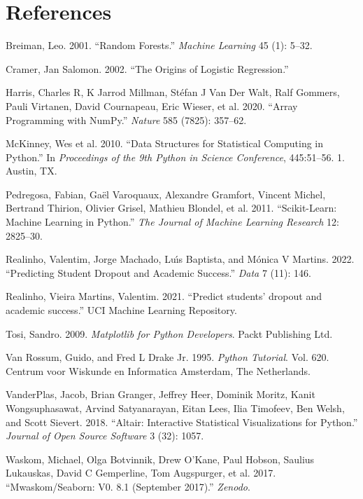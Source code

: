 \documentclass[
]{article}
\newlength{\cslhangindent}
\newlength{\cslentryspacingunit} %
\newenvironment{CSLReferences}[2] %
 {%
  \setlength{\parindent}{0pt}
  \ifodd #1
  \let\oldpar\par
  \def\par{\hangindent=\cslhangindent\oldpar}
  \fi
  \setlength{\parskip}{#2\cslentryspacingunit}
 }%
 {}
\begin{document}
\hypertarget{references}{%
\section*{References}\label{references}}

\hypertarget{refs}{}
\begin{CSLReferences}{1}{0}
\leavevmode{}%
Breiman, Leo. 2001. {``Random Forests.''} \emph{Machine Learning} 45
(1): 5--32.

\leavevmode{}%
Cramer, Jan Salomon. 2002. {``The Origins of Logistic Regression.''}

\leavevmode{}%
Harris, Charles R, K Jarrod Millman, Stéfan J Van Der Walt, Ralf
Gommers, Pauli Virtanen, David Cournapeau, Eric Wieser, et al. 2020.
{``Array Programming with NumPy.''} \emph{Nature} 585 (7825): 357--62.

\leavevmode{}%
McKinney, Wes et al. 2010. {``Data Structures for Statistical Computing
in Python.''} In \emph{Proceedings of the 9th Python in Science
Conference}, 445:51--56. 1. Austin, TX.

\leavevmode{}%
Pedregosa, Fabian, Gaël Varoquaux, Alexandre Gramfort, Vincent Michel,
Bertrand Thirion, Olivier Grisel, Mathieu Blondel, et al. 2011.
{``Scikit-Learn: Machine Learning in Python.''} \emph{The Journal of
Machine Learning Research} 12: 2825--30.

\leavevmode{}%
Realinho, Valentim, Jorge Machado, Luı́s Baptista, and Mónica V Martins.
2022. {``Predicting Student Dropout and Academic Success.''} \emph{Data}
7 (11): 146.

\leavevmode{}%
Realinho, Vieira Martins, Valentim. 2021. {``{Predict students' dropout
and academic success}.''} UCI Machine Learning Repository.

\leavevmode{}%
Tosi, Sandro. 2009. \emph{Matplotlib for Python Developers}. Packt
Publishing Ltd.

\leavevmode{}%
Van Rossum, Guido, and Fred L Drake Jr. 1995. \emph{Python Tutorial}.
Vol. 620. Centrum voor Wiskunde en Informatica Amsterdam, The
Netherlands.

\leavevmode{}%
VanderPlas, Jacob, Brian Granger, Jeffrey Heer, Dominik Moritz, Kanit
Wongsuphasawat, Arvind Satyanarayan, Eitan Lees, Ilia Timofeev, Ben
Welsh, and Scott Sievert. 2018. {``Altair: Interactive Statistical
Visualizations for Python.''} \emph{Journal of Open Source Software} 3
(32): 1057.

\leavevmode{}%
Waskom, Michael, Olga Botvinnik, Drew O'Kane, Paul Hobson, Saulius
Lukauskas, David C Gemperline, Tom Augspurger, et al. 2017.
{``Mwaskom/Seaborn: V0. 8.1 (September 2017).''} \emph{Zenodo}.

\end{CSLReferences}
\end{document}
